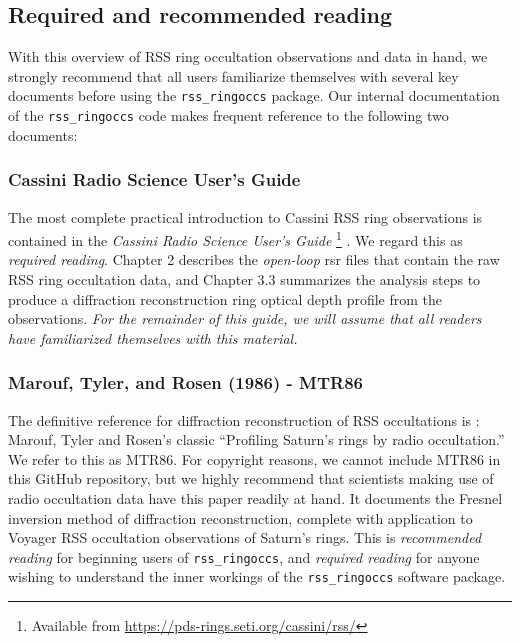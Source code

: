 \documentclass[titlepage, 12pt]{article}
\begin{document}
            \subsection{Required and recommended reading}
            With this overview of RSS ring occultation
            observations and data in hand,
            we strongly recommend that all users
            familiarize themselves with several key
            documents before using the \texttt{rss\_ringoccs}
            package. Our internal documentation of the
            \texttt{rss\_ringoccs} code makes frequent
            reference to the following two documents:
            \subsubsection{Cassini Radio Science User's Guide}
                \label{sec:CRSUG}
                The most complete practical introduction
                to Cassini RSS ring observations is contained
                in the \textit{Cassini Radio Science User's Guide}%
                \footnote{Available from
                          \url{https://pds-rings.seti.org/cassini/rss/}}
                \citep{CRSUG2018}.
                We regard this as \textit{required reading}.
                Chapter 2
                describes the \textit{open-loop}
                \gls{rsr} files that
                contain the raw RSS ring occultation data,
                and Chapter
                3.3 summarizes the analysis steps to produce a
                diffraction reconstruction ring optical depth
                profile from the observations.
                \textit{For the remainder of this guide, we
                        will assume that all readers have familiarized
                        themselves with this material.}
            \subsubsection{Marouf, Tyler, and Rosen (1986) - MTR86}
                The definitive reference for
                diffraction reconstruction of
                RSS occultations is \citealt{Marouf1986}:
                Marouf, Tyler and
                Rosen's classic ``Profiling Saturn's rings by radio
                occultation.''
                We refer to this as MTR86.
                For copyright reasons,
                we cannot include MTR86 in this
                GitHub repository, but we highly recommend that
                scientists making use of radio occultation data
                have this paper readily at hand. It
                documents the Fresnel inversion method of
                diffraction reconstruction,
                complete with application to Voyager
                RSS occultation observations of Saturn's rings.
                This is \textit{recommended reading} for beginning users
                of \texttt{rss\_ringoccs}, and \textit{required reading}
                for anyone wishing to understand the
                inner workings of the \texttt{rss\_ringoccs}
                software package.
\end{document}
